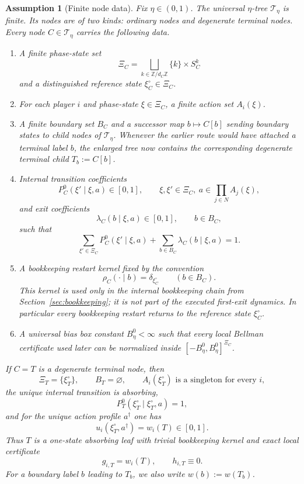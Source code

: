 \documentclass[12pt]{article}
\newtheorem{assumption}[theorem]{Assumption}
\theoremstyle{definition}
\newcommand{\1}{\mathbf{1}}
\newcommand{\cT}{\mathcal{T}}
\begin{document}
\begin{assumption}[Finite node data]
\label{ass:node-data}
Fix $\eta\in(0,1)$. The universal $\eta$-tree $\cT_\eta$ is finite. Its nodes are
of two kinds: ordinary nodes and degenerate terminal nodes. Every node
$C\in \cT_\eta$ carries the following data.
\begin{enumerate}[label=\textnormal{(D\arabic*)},leftmargin=2.8em]
\item A finite phase-state set
\[
\Xi_C=\bigsqcup_{k\in\mathbb Z/d_C\mathbb Z}\{k\}\times S_C^k
\]
and a distinguished reference state $\xi_C^\circ\in\Xi_C$.
\item For each player $i$ and phase-state $\xi\in\Xi_C$, a finite action set
$A_i(\xi)$.
\item A finite boundary set $B_C$ and a successor map $b\mapsto C[b]$ sending
boundary states to child nodes of $\cT_\eta$. Whenever the earlier route would
have attached a terminal label $b$, the enlarged tree now contains the
corresponding degenerate terminal child $T_b:=C[b]$.
\item Internal transition coefficients
\[
P_C^0(\xi'\mid \xi,a)\in[0,1],
\qquad \xi,\xi'\in \Xi_C,
\ a\in \prod_{j\in N}A_j(\xi),
\]
and exit coefficients
\[
\lambda_C(b\mid \xi,a)\in[0,1],
\qquad b\in B_C,
\]
such that
\[
\sum_{\xi'\in\Xi_C}P_C^0(\xi'\mid \xi,a)+\sum_{b\in B_C}\lambda_C(b\mid\xi,a)=1.
\]
\item A bookkeeping restart kernel fixed by the convention
\[
\rho_C(\cdot\mid b)=\delta_{\xi_C^\circ}
\qquad (b\in B_C).
\]
This kernel is used only in the internal bookkeeping chain from
Section~\ref{sec:bookkeeping}; it is not part of the executed first-exit
dynamics. In particular every bookkeeping restart returns to the reference
state $\xi_C^\circ$.
\item A universal bias box constant $B_\eta^0<\infty$ such that every local
Bellman certificate used later can be normalized inside
$[-B_\eta^0,B_\eta^0]^{\Xi_C}$.
\end{enumerate}

If $C=T$ is a degenerate terminal node, then
\[
\Xi_T=\{\xi_T^\circ\},
\qquad
B_T=\varnothing,
\qquad
A_i(\xi_T^\circ)\text{ is a singleton for every }i,
\]
the unique internal transition is absorbing,
\[
P_T^0(\xi_T^\circ\mid \xi_T^\circ,a)=1,
\]
and for the unique action profile $a^\dagger$ one has
\[
u_i(\xi_T^\circ,a^\dagger)=w_i(T)\in[0,1].
\]
Thus $T$ is a one-state absorbing leaf with trivial bookkeeping kernel and exact
local certificate
\[
g_{i,T}=w_i(T),
\qquad
h_{i,T}\equiv 0.
\]
For a boundary label $b$ leading to $T_b$, we also write $w(b):=w(T_b)$.
\end{assumption}
\end{document}
